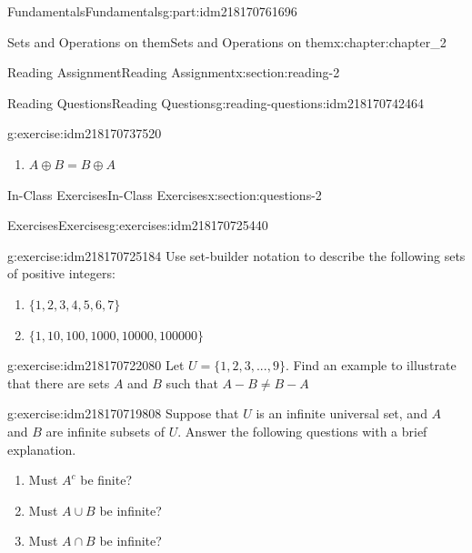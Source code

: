 \documentclass[oneside,10pt,]{book}
\numberwithin{equation}{section}
\begin{document}
\begin{partptx}{Fundamentals}{}{Fundamentals}{}{}{g:part:idm218170761696}
\begin{chapterptx}{Sets and Operations on them}{}{Sets and Operations on them}{}{}{x:chapter:chapter_2}
\begin{sectionptx}{Reading Assignment}{}{Reading Assignment}{}{}{x:section:reading-2}
\begin{reading-questions-subsection-numberless}{Reading Questions}{}{Reading Questions}{}{}{g:reading-questions:idm218170742464}
\begin{divisionexercise}{3}{}{}{g:exercise:idm218170737520}
\begin{multicols}{2}
\begin{enumerate}[label=(\alph*)]
\item{}\(\displaystyle A \oplus  B = B \oplus  A\)%
\end{enumerate}
\end{multicols}
%
\end{divisionexercise}%
\end{reading-questions-subsection-numberless}
\end{sectionptx}
%
%
\typeout{************************************************}
\typeout{************************************************}
%
\begin{sectionptx}{In-Class Exercises}{}{In-Class Exercises}{}{}{x:section:questions-2}
%
%
%
\typeout{************************************************}
\typeout{************************************************}
%
\begin{exercises-subsection-numberless}{Exercises}{}{Exercises}{}{}{g:exercises:idm218170725440}
\par\medskip\noindent%
%
\begin{exercisegroup}
\begin{divisionexerciseeg}{1}{}{}{g:exercise:idm218170725184}%
Use set-builder notation to describe the following sets of positive integers:%
\begin{enumerate}[label=(\alph*)]
\item{}\(\displaystyle \{1, 2, 3, 4, 5, 6, 7\}\)%
\item{}\(\displaystyle \{1, 10, 100, 1000, 10000, 100000\}\)%
\end{enumerate}
%
\end{divisionexerciseeg}%
\begin{divisionexerciseeg}{2}{}{}{g:exercise:idm218170722080}%
Let \(U= \{1, 2, 3, . . . , 9\}\). Find an example to illustrate that there are sets \(A\) and \(B\) such that \(A - B \neq  B - A\)%
\end{divisionexerciseeg}%
\begin{divisionexerciseeg}{3}{}{}{g:exercise:idm218170719808}%
Suppose that \(U\) is an infinite universal set, and \(A\) and \(B\) are infinite subsets of \(U\). Answer the following questions with a brief explanation.%
\par
%
\begin{enumerate}[label=(\alph*)]
\item{}Must \(A^c\) be finite?%
\item{}Must \(A\cup B\) be infinite?%
\item{}Must \(A\cap B\) be infinite?%

\end{enumerate}
\end{divisionexerciseeg}
\end{exercisegroup}
\end{exercises-subsection-numberless}
\end{sectionptx}
\end{chapterptx}
\end{partptx}
\end{document}
